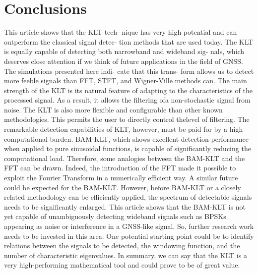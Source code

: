 \documentclass[12pt]{report}
\begin{document}
\section*{Conclusions}
This article shows that the KLT tech-
nique has very high potential and can
outperform the classical signal detec-
tion methods that are used today. The
KLT is equally capable of detecting
both narrowband and wideband sig-
nals, which deserves close attention if
we think of future applications in the
field of GNSS. The simulations
presented here indi-
cate that this trans-
form allows us to
detect more feeble
signals than FFT, STFT, and Wigner-Ville methods can. The main strength of the KLT is its natural feature of adapting to the characteristics of the processed signal. As a result, it allows the filtering ofa non-stochastic signal from noise.
The KLT is also more flexible and configurable than other known methodologies. This permits the user to directly control thelevel of filtering. The remarkable detection capabilities of KLT, however, must be paid for by a high computational burden.
BAM-KLT, which shows excellent detection performance when applied to pure sinusoidal functions, is capable of significantly reducing the computational load. Therefore, some analogies between the BAM-KLT and the FFT can be drawn. Indeed, the introduction of the FFT made it possible to exploit the Fourier Transform in a numerically efficient way.
A similar future could be expected for the BAM-KLT. However, before BAM-KLT or a closely related methodology can be efficiently applied, the spectrum of detectable signals needs to be significantly enlarged. This article shows that the BAM-KLT is not yet capable of unambiguously detecting wideband signals such as BPSKs appearing as noise or interference in a GNSS-like signal. So, further research work needs to be invested in this area. One potential starting point could be to identify relations between the signals to be detected, the windowing function, and the number of characteristic eigenvalues.
In summary, we can say that the KLT
is a very high-performing mathematical
tool and could prove to be of great value.
\end{document}
